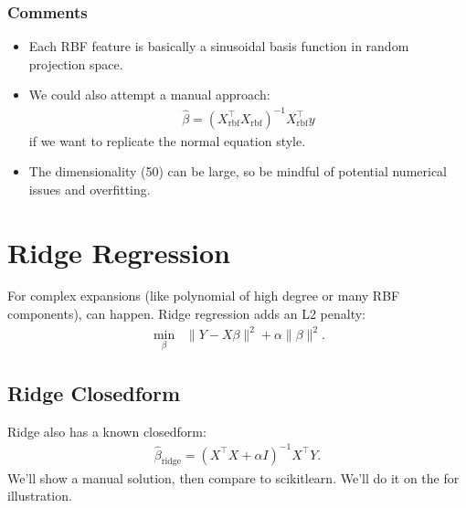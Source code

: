 \documentclass[letterpaper,10pt,english]{jupyterBook}
\begin{document}
\subsubsection{Comments}
\label{\detokenize{02:id1}}\begin{itemize}
\item {} 
\sphinxAtStartPar
Each RBF feature is basically a sinusoidal basis function in random projection space.

\item {} 
\sphinxAtStartPar
We could also attempt a manual approach:
\begin{equation*}
\begin{split}
    \hat{\beta} = (X_{\mathrm{rbf}}^\top X_{\mathrm{rbf}})^{-1} X_{\mathrm{rbf}}^\top y
  \end{split}
\end{equation*}
\sphinxAtStartPar
if we want to replicate the normal equation style.

\item {} 
\sphinxAtStartPar
The dimensionality (50) can be large, so be mindful of potential numerical issues and overfitting.

\end{itemize}


\section{Ridge Regression}
\label{\detokenize{02:ridge-regression}}
\sphinxAtStartPar
For complex expansions (like polynomial of high degree or many RBF components),  can happen.
Ridge regression adds an L2 penalty:
\begin{equation*}
\begin{split}
  \min_{\beta} \;\; \| Y - X \beta \|^2 + \alpha \| \beta \|^2.
\end{split}
\end{equation*}

\subsection{Ridge Closed\sphinxhyphen{}form}
\label{\detokenize{02:ridge-closed-form}}
\sphinxAtStartPar
Ridge also has a known closed\sphinxhyphen{}form:
\begin{equation*}
\begin{split}
  \hat{\beta}_{\mathrm{ridge}} = (X^\top X + \alpha I)^{-1} X^\top Y.
\end{split}
\end{equation*}
\sphinxAtStartPar
We’ll show a manual solution, then compare to scikit\sphinxhyphen{}learn. We’ll do it on the  for illustration.
\end{document}
